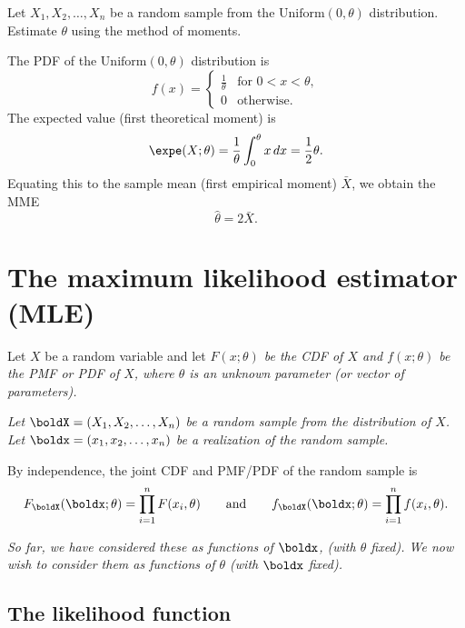 \begin{example}
Let $X_1,X_2,\ldots,X_n$ be a random sample from the $\text{Uniform}(0,\theta)$ distribution. Estimate $\theta$ using the method of moments.
\end{example}
\begin{solution}
The PDF of the $\text{Uniform}(0,\theta)$ distribution is
\[
f(x) = \left\{\begin{array}{ll}
	\displaystyle\frac{1}{\theta}	& \text{for } 0 < x < \theta, \\[2ex]
	0				& \text{otherwise}.
\end{array}\right.
\]
The expected value (first theoretical moment) is 
\[
\expe(X;\theta) = \frac{1}{\theta}\int_{0}^{\theta}x\,dx = \frac{1}{2}\theta. 
\]
Equating this to the sample mean (first empirical moment) $\bar{X}$, we obtain the MME
\[
\hat{\theta}= 2\bar{X}.
\] 
\end{solution}

\section{The maximum likelihood estimator (MLE)} 
Let $X$ be a random variable and let 
\bit
\it $F(x;\theta)$ be the CDF of $X$ and 
\it $f(x;\theta)$ be the PMF or PDF of $X$, 
\eit
where $\theta$ is an unknown parameter (or vector of parameters).

\vspace{2ex}
\bit
\it Let $\boldX = (X_1,X_2,\ldots,X_n)$ be a random sample from the distribution of $X$. 
\it Let $\boldx = (x_1,x_2,\ldots,x_n)$ be a realization of the random sample.
\eit

By independence, the joint CDF and PMF/PDF of the random sample is 
\[
F_{\boldX}(\boldx;\theta) = \prod_{i=1}^n F(x_i,\theta)
\qquad\text{and}\qquad
f_{\boldX}(\boldx;\theta) = \prod_{i=1}^n f(x_i,\theta).
\]

\bit
\it So far, we have considered these as functions of $\boldx$, (with $\theta$ fixed).
\it We now wish to consider them as functions of $\theta$ (with $\boldx$ fixed).
\eit


\subsection{The likelihood function}

